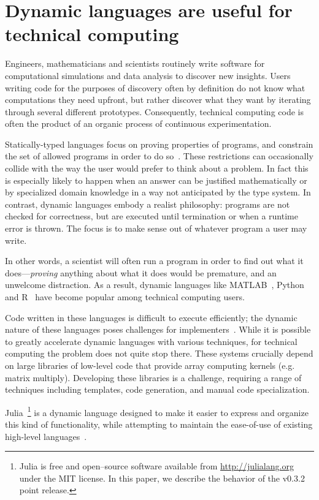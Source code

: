 \documentclass[pldi]{sigplanconf-pldi15}
\begin{document}

\section{Dynamic languages are useful for technical computing}

Engineers, mathematicians and scientists routinely write software for
computational simulations and data analysis to discover new insights.
Users writing code for the purposes of discovery often by definition do not
know what computations they need upfront, but rather discover what they want by
iterating through several different prototypes. Consequently, technical
computing code is often the product of an organic process of continuous
experimentation.

Statically-typed languages focus on proving properties of programs, and constrain
the set of allowed programs in order to do so~\cite{Pierce2002}.
These restrictions can occasionally collide with the way the user would
prefer to think about a problem. In fact this is especially likely to happen
when an answer can be justified mathematically or by specialized domain
knowledge in a way not anticipated by the type system.
In contrast,
dynamic languages embody a realist philosophy: programs are not checked for
correctness, but are executed until termination or when a runtime error is
thrown. The focus is to make sense out of whatever program a user may write.

In other words, a scientist will often run a program in order to find out what
it does---\emph{proving} anything about what it does would be premature, and an
unwelcome distraction. As a result, dynamic languages like
MATLAB~\cite{matlab}, Python~\cite{pythonlib,pythonref} and R~\cite{rlang} have
become popular among technical computing users.

Code written in these languages is difficult to execute efficiently;
the dynamic nature of these languages poses challenges for
implementers~\cite{Joisha2001,Joisha2006,Seljebotn2009}. While it is possible
to greatly accelerate dynamic languages with various techniques, for
technical computing the problem does not quite stop there. These systems
crucially depend on large libraries of low-level code that provide array
computing kernels (e.g. matrix multiply). Developing these libraries is a
challenge, requiring a range of techniques including templates,
code generation, and manual code specialization.

Julia~\footnote{Julia is free and open--source software available from
\url{http://julialang.org} under the MIT license. In this paper, we describe
the behavior of the v0.3.2 point release.} is a dynamic language designed to
make it easier to express and organize this kind of functionality, while
attempting to maintain the ease-of-use of existing high-level
languages~\cite{Bezanson2012,Bezanson2014b}.
\end{document}
